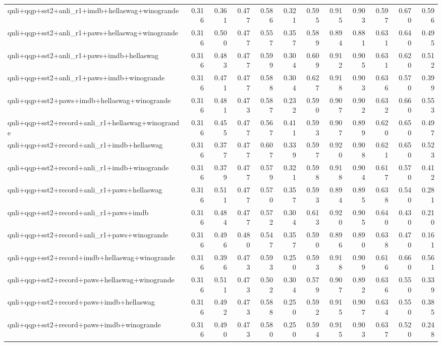 \begin{table}[t]
\begin{tabular}{lrrrrrrrrrrr}
    qnli+qqp+sst2+anli\_r1+imdb+hellaswag+winogrande & 0.316 & 0.361 & 0.477 & 0.586 & 0.321 & 0.595 & 0.915 & 0.903 & 0.597 & 0.670 & 0.596 \\
    qnli+qqp+sst2+anli\_r1+paws+hellaswag+winogrande & 0.316 & 0.500 & 0.477 & 0.557 & 0.357 & 0.589 & 0.894 & 0.881 & 0.631 & 0.640 & 0.495 \\
    qnli+qqp+sst2+anli\_r1+paws+imdb+hellaswag & 0.316 & 0.483 & 0.477 & 0.599 & 0.304 & 0.609 & 0.912 & 0.905 & 0.631 & 0.620 & 0.512 \\
    qnli+qqp+sst2+anli\_r1+paws+imdb+winogrande & 0.316 & 0.471 & 0.477 & 0.588 & 0.304 & 0.627 & 0.918 & 0.903 & 0.636 & 0.570 & 0.399 \\
    qnli+qqp+sst2+paws+imdb+hellaswag+winogrande & 0.316 & 0.481 & 0.473 & 0.587 & 0.232 & 0.590 & 0.907 & 0.902 & 0.632 & 0.660 & 0.553 \\
    qnli+qqp+sst2+record+anli\_r1+hellaswag+winogrande & 0.316 & 0.455 & 0.477 & 0.567 & 0.411 & 0.593 & 0.907 & 0.899 & 0.620 & 0.650 & 0.497 \\
    qnli+qqp+sst2+record+anli\_r1+imdb+hellaswag & 0.316 & 0.377 & 0.477 & 0.607 & 0.339 & 0.597 & 0.920 & 0.908 & 0.621 & 0.650 & 0.523 \\
    qnli+qqp+sst2+record+anli\_r1+imdb+winogrande & 0.316 & 0.379 & 0.477 & 0.579 & 0.321 & 0.598 & 0.918 & 0.904 & 0.617 & 0.570 & 0.412 \\
    qnli+qqp+sst2+record+anli\_r1+paws+hellaswag & 0.316 & 0.511 & 0.477 & 0.570 & 0.357 & 0.593 & 0.894 & 0.895 & 0.638 & 0.540 & 0.281 \\
    qnli+qqp+sst2+record+anli\_r1+paws+imdb & 0.316 & 0.484 & 0.477 & 0.572 & 0.304 & 0.613 & 0.920 & 0.905 & 0.640 & 0.430 & 0.210 \\
    qnli+qqp+sst2+record+anli\_r1+paws+winogrande & 0.316 & 0.496 & 0.480 & 0.547 & 0.357 & 0.590 & 0.896 & 0.890 & 0.638 & 0.470 & 0.161 \\
    qnli+qqp+sst2+record+imdb+hellaswag+winogrande & 0.316 & 0.396 & 0.473 & 0.593 & 0.250 & 0.593 & 0.918 & 0.909 & 0.616 & 0.660 & 0.561 \\
    qnli+qqp+sst2+record+paws+hellaswag+winogrande & 0.316 & 0.511 & 0.473 & 0.502 & 0.304 & 0.579 & 0.907 & 0.892 & 0.636 & 0.550 & 0.339 \\
    qnli+qqp+sst2+record+paws+imdb+hellaswag & 0.316 & 0.492 & 0.473 & 0.588 & 0.250 & 0.592 & 0.915 & 0.907 & 0.634 & 0.550 & 0.385 \\
    qnli+qqp+sst2+record+paws+imdb+winogrande & 0.316 & 0.490 & 0.473 & 0.580 & 0.250 & 0.594 & 0.915 & 0.903 & 0.637 & 0.520 & 0.248 \\

\end{tabular}
\end{table}
